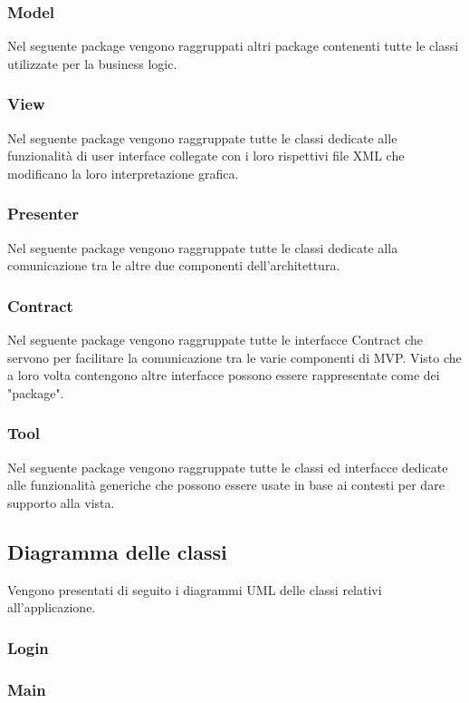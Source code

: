 \subsubsection{Model}
Nel seguente package vengono raggruppati altri package contenenti tutte le classi utilizzate per la business logic. 

\subsubsection{View}
Nel seguente package vengono raggruppate tutte le classi dedicate alle funzionalità di user interface collegate con i loro rispettivi file XML che modificano la loro interpretazione grafica.

\subsubsection{Presenter}
Nel seguente package vengono raggruppate tutte le classi dedicate alla comunicazione tra le altre due componenti dell'architettura.

\subsubsection{Contract}
Nel seguente package vengono raggruppate tutte le interfacce Contract che servono per facilitare la comunicazione tra le varie componenti di MVP. Visto che a loro volta contengono altre interfacce possono essere rappresentate come dei "package".

\subsubsection{Tool}
Nel seguente package vengono raggruppate tutte le classi ed interfacce dedicate alle funzionalità generiche che possono essere usate in base ai contesti per dare supporto alla vista.


\subsection{Diagramma delle classi}
Vengono presentati di seguito i diagrammi UML delle classi relativi all'applicazione.

\subsubsection{Login}

\subsubsection{Main}

